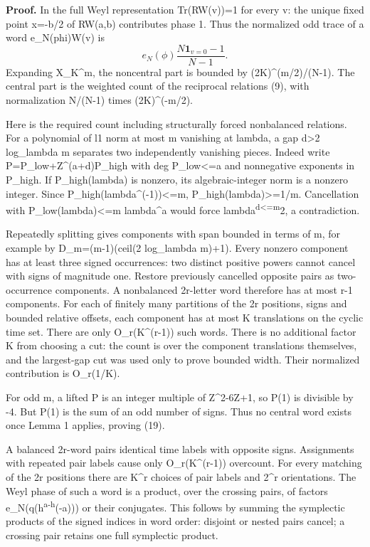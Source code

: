 \documentclass[11pt,a4paper]{article}
\begin{document}
\textbf{Proof.} In the full Weyl representation Tr(RW(v))=1 for every v: the unique fixed point x=-b/2 of RW(a,b) contributes phase 1. Thus the normalized odd trace of a word e\_N(phi)W(v) is \[
 e_N(\phi)\frac{N\mathbf1_{v=0}-1}{N-1}.                       \tag{20}
\] Expanding X\_K\^{}m, the noncentral part is bounded by (2K)\^{}(m/2)/(N-1). The central part is the weighted count of the reciprocal relations (9), with normalization N/(N-1) times (2K)\^{}(-m/2).

Here is the required count including structurally forced nonbalanced relations. For a polynomial of l1 norm at most m vanishing at lambda, a gap d\textgreater2 log\_lambda m separates two independently vanishing pieces. Indeed write P=P\_low+Z\^{}(a+d)P\_high with deg P\_low\textless=a and nonnegative exponents in P\_high. If P\_high(lambda) is nonzero, its algebraic-integer norm is a nonzero integer. Since \textbar P\_high(lambda\^{}(-1))\textbar\textless=m, \textbar P\_high(lambda)\textbar\textgreater=1/m. Cancellation with \textbar P\_low(lambda)\textbar\textless=m lambda\^{}a would force lambda\textsuperscript{d\textless=m}2, a contradiction.

Repeatedly splitting gives components with span bounded in terms of m, for example by D\_m=(m-1)(ceil(2 log\_lambda m)+1). Every nonzero component has at least three signed occurrences: two distinct positive powers cannot cancel with signs of magnitude one. Restore previously cancelled opposite pairs as two-occurrence components. A nonbalanced 2r-letter word therefore has at most r-1 components. For each of finitely many partitions of the 2r positions, signs and bounded relative offsets, each component has at most K translations on the cyclic time set. There are only O\_r(K\^{}(r-1)) such words. There is no additional factor K from choosing a cut: the count is over the component translations themselves, and the largest-gap cut was used only to prove bounded width. Their normalized contribution is O\_r(1/K).

For odd m, a lifted P is an integer multiple of Z\^{}2-6Z+1, so P(1) is divisible by -4. But P(1) is the sum of an odd number of signs. Thus no central word exists once Lemma 1 applies, proving (19).

A balanced 2r-word pairs identical time labels with opposite signs. Assignments with repeated pair labels cause only O\_r(K\^{}(r-1)) overcount. For every matching of the 2r positions there are K\^{}r choices of pair labels and 2\^{}r orientations. The Weyl phase of such a word is a product, over the crossing pairs, of factors e\_N(q(h\textsuperscript{a-h}(-a))) or their conjugates. This follows by summing the symplectic products of the signed indices in word order: disjoint or nested pairs cancel; a crossing pair retains one full symplectic product.
\end{document}
